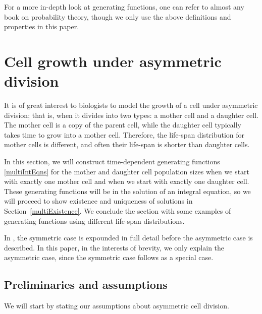 \documentclass[12pt]{amsart}
\theoremstyle{plain}
\theoremstyle{definition}
\theoremstyle{remark}
\theoremstyle{definition}
\begin{document}
For a more in-depth look at generating functions, one can refer to almost any book on probability theory, though we only use the above definitions and properties in this paper.

\section{Cell growth under asymmetric division} \label{multiTypeGrowth}

It is of great interest to biologists to model the growth of a cell under asymmetric division; that is, when it divides into two types: a mother cell and a daughter cell. The mother cell is a copy of the parent cell, while the daughter cell typically takes time to grow into a mother cell. Therefore, the life-span distribution for mother cells is different, and often their life-span is shorter than daughter cells.

In this section, we will construct time-dependent generating functions \eqref{multiIntEqns} for the mother and daughter cell population sizes when we start with exactly one mother cell and when we start with exactly one daughter cell. These generating functions will be in the solution of an integral equation, so we will proceed to show existence and uniqueness of solutions in Section~\ref{multiExistence}. We conclude the section with some examples of generating functions using different life-span distributions.

In \cite{Oveys-thesis}, the symmetric case is expounded in full detail before the asymmetric case is described.  In this paper, in the interests of brevity, we only explain the asymmetric case, since the symmetric case follows as a special case.

\subsection{Preliminaries and assumptions}

We will start by stating our assumptions about asymmetric cell division.
\end{document}
